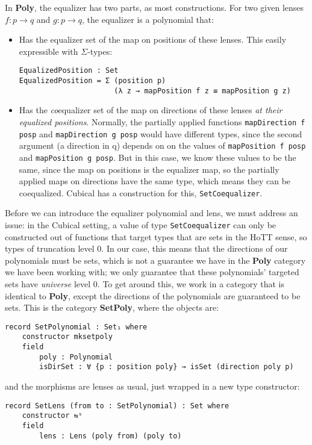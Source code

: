 In \textbf{Poly}, the equalizer has two parts, as most constructions. For two given lenses $f : p \rightarrow q$ and $g : p \rightarrow q$, the equalizer is a polynomial that:
\begin{itemize}
    \item Has the equalizer set of the map on positions of these lenses. This easily expressible with $\Sigma$-types:
    \begin{verbatim}
EqualizedPosition : Set
EqualizedPosition = Σ (position p)
                      (λ z → mapPosition f z ≡ mapPosition g z)
    \end{verbatim}
    \item Has the \textit{co}equalizer set of the map on directions of these lenses \textit{at their equalized positions}. Normally, the partially applied functions \texttt{mapDirection f posp} and \texttt{mapDirection g posp} would have different types, since the second argument (a direction in q) depends on on the values of \texttt{mapPosition f posp} and \texttt{mapPosition g posp}. But in this case, we know these values to be the same, since the map on positions is the equalizer map, so the partially applied maps on directions have the same type, which means they can be coequalized. Cubical has a construction for this, \texttt{SetCoequalizer}.
\end{itemize}

Before we can introduce the equalizer polynomial and lens, we must address an issue: in the Cubical setting, a value of type \texttt{SetCoequalizer} can only be constructed out of functions that target types that are sets in the HoTT sense, so types of truncation level 0. In our case, this means that the directions of our polynomials must be sets, which is not a guarantee we have in the \textbf{Poly} category we have been working with; we only guarantee that these polynomials' targeted sets have \textit{universe} level 0. To get around this, we work in a category that is identical to \textbf{Poly}, except the directions of the polynomials are guaranteed to be sets. This is the category \textbf{SetPoly}, where the objects are:

\begin{verbatim}
record SetPolynomial : Set₁ where
    constructor mksetpoly
    field
        poly : Polynomial
        isDirSet : ∀ {p : position poly} → isSet (direction poly p)
\end{verbatim}
and the morphisms are lenses as usual, just wrapped in a new type constructor:
\begin{verbatim}
record SetLens (from to : SetPolynomial) : Set where
    constructor ⇆ˢ
    field
        lens : Lens (poly from) (poly to)
\end{verbatim}

